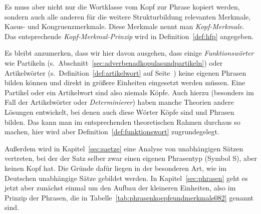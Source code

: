 Es muss aber nicht nur die Wortklasse vom Kopf zur Phrase kopiert werden, sondern auch alle anderen für die weitere Strukturbildung relevanten Merkmale, \zB Kasus- und Kongruenzmerkmale.
Diese Merkmale nennt man \textit{Kopf-Merkmale}.
Das entsprechende \textit{Kopf-Merkmal-Prinzip} wird in Definition~\ref{def:hfp} angegeben.

\Stretch


\Np

Es bleibt anzumerken, dass wir hier davon ausgehen, dass einige \textit{Funktionswörter} wie Partikeln (s.\ Abschnitt~\ref{sec:adverbenadkopulasundpartikeln}) oder Artikelwörter (s.\ Definition~\ref{def:artikelwort} auf Seite~\pageref{def:artikelwort}) keine eigenen Phrasen bilden können und direkt in größere Einheiten eingesetzt werden müssen.
Eine Partikel oder ein Artikelwort sind also niemals Köpfe.
Auch hierzu (besonders im Fall der Artikelwörter oder \textit{Determinierer}) haben manche Theorien andere Lösungen entwickelt, bei denen auch diese Wörter Köpfe sind und Phrasen bilden.
Das kann man im entsprechenden theoretischen Rahmen durchaus so machen, hier wird aber Definition~\ref{def:funktionswort} zugrundegelegt.


Außerdem wird in Kapitel~\ref{sec:saetze} eine Analyse von unabhängigen Sätzen vertreten, bei der der Satz selber zwar einen eigenen Phrasentyp (\zB Symbol S), aber keinen Kopf hat.
Die Gründe dafür liegen in der besonderen Art, wie im Deutschen unabhängige Sätze gebildet werden.
In Kapitel~\ref{sec:phrasen} geht es jetzt aber zunächst einmal um den Aufbau der kleineren Einheiten, also im Prinzip der Phrasen, die in Tabelle~\ref{tab:phrasenkoepfeundmerkmale082} genannt sind.


